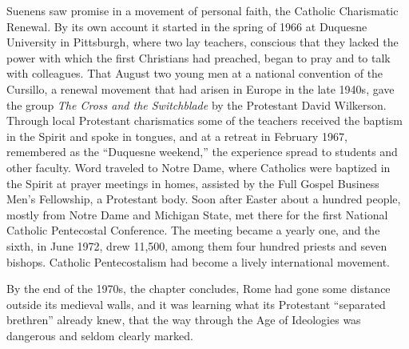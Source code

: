Suenens saw promise in a movement of personal faith, the Catholic Charismatic Renewal. By its own
account it started in the spring of 1966 at Duquesne University in Pittsburgh, where two lay
teachers, conscious that they lacked the power with which the first Christians had preached, began to
pray and to talk with colleagues. That August two young men at a national convention of the Cursillo,
a renewal movement that had arisen in Europe in the late 1940s, gave the group \emph{The Cross and
the Switchblade} by the Protestant David Wilkerson. Through local Protestant charismatics some of
the teachers received the baptism in the Spirit and spoke in tongues, and at a retreat in February
1967, remembered as the ``Duquesne weekend,'' the experience spread to students and other faculty.
Word traveled to Notre Dame, where Catholics were baptized in the Spirit at prayer meetings in homes,
assisted by the Full Gospel Business Men's Fellowship, a Protestant body. Soon after Easter about a
hundred people, mostly from Notre Dame and Michigan State, met there for the first National Catholic
Pentecostal Conference. The meeting became a yearly one, and the sixth, in June 1972, drew 11,500,
among them four hundred priests and seven bishops. Catholic Pentecostalism had become a lively
international movement.

By the end of the 1970s, the chapter concludes, Rome had gone some distance outside its medieval
walls, and it was learning what its Protestant ``separated brethren'' already knew, that the way
through the Age of Ideologies was dangerous and seldom clearly marked.

\begin{keyfacts}
\end{keyfacts}
